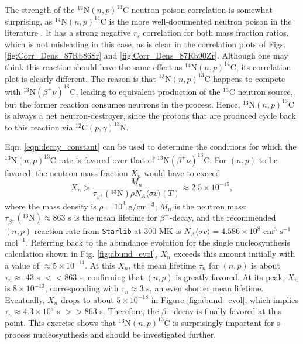 The strength of the $^{13}\mathrm{N}(n,p)^{13}\mathrm{C}$ neutron poison correlation is somewhat surprising, as $^{14}\mathrm{N}(n,p)^{14}\mathrm{C}$ is the more well-documented neutron poison in the literature \cite{Habing2004}. It has a strong negative $r_{s}$ correlation for both mass fraction ratios, which is not misleading in this case, as is clear in the correlation plots of Figs. \ref{fig:Corr_Dens_87Rb86Sr} and \ref{fig:Corr_Dens_87Rb90Zr}. Although one may think this reaction should have the same effect as $^{14}\mathrm{N}(n,p)^{14}\mathrm{C}$, its correlation plot is clearly different. The reason is that $^{13}\mathrm{N}(n,p)^{13}\mathrm{C}$ happens to compete with $^{13}\mathrm{N}(\beta^{+}\nu)^{13}\mathrm{C}$, leading to equivalent production of the $^{13}$C neutron source, but the former reaction consumes neutrons in the process. Hence, $^{13}\mathrm{N}(n,p)^{13}\mathrm{C}$ is always a net neutron-destroyer, since the protons that are produced cycle back to this reaction via $^{12}\mathrm{C}(p, \gamma)^{13}\mathrm{N}$.

Eqn. \ref{eqn:decay_constant} can be used to determine the conditions for which the $^{13}\mathrm{N}(n,p)^{13}\mathrm{C}$ rate is favored over that of $^{13}\mathrm{N}(\beta^{+}\nu)^{13}\mathrm{C}$. For $(n,p)$ to be favored, the neutron mass fraction $X_{n}$ would have to exceed
\begin{equation} \label{eqn:n_mass_frac_condition}
X_{n} > \frac{M_{n}}{\tau_{\beta^{+}}(^{13}\mathrm{N}) \rho N_{A} \langle \sigma v \rangle(T)} \approx 2.5 \times 10^{-15},
\end{equation}
where the mass density is $\rho = 10^{3}$ $\mathrm{g}/\mathrm{cm}^{-3}$; $M_{n}$ is the neutron mass; $\tau_{\beta^{+}}(^{13}\mathrm{N}) \approx 863$ s \cite{Audi2003} is the mean lifetime for $\beta^{+}$-decay, and the recommended $(n,p)$ reaction rate from \texttt{Starlib} at 300 MK is $N_{A} \langle \sigma v \rangle = 4.586 \times 10^{8}$ $\mathrm{cm}^{3}$ $\mathrm{s}^{-1}$ $\mathrm{mol}^{-1}$. Referring back to the abundance evolution for the single nucleosynthesis calculation shown in Fig. \ref{fig:abund_evol}, $X_{n}$ exceeds this amount initially with a value of $\approx 5 \times 10^{-14}$. At this $X_{n}$, the mean lifetime $\tau_{n}$ for $(n,p)$ is about $\tau_{n} \approx$ 43 s $<< 863$ s, confirming that $(n,p)$ is greatly favored. At its peak, $X_{n}$ is $8 \times 10^{-13}$, corresponding with $\tau_{n} \approx 3$ s, an even shorter mean lifetime. Eventually, $X_{n}$ drops to about $5 \times 10^{-18}$ in Figure \ref{fig:abund_evol}, which implies $\tau_{n} \approx 4.3 \times 10^{5}$ s $>> 863$ s. Therefore, the $\beta^{+}$-decay is finally favored at this point. This exercise shows that $^{13}\mathrm{N}(n,p)^{13}\mathrm{C}$ is surprisingly important for s-process nucleosynthesis and should be investigated further.

